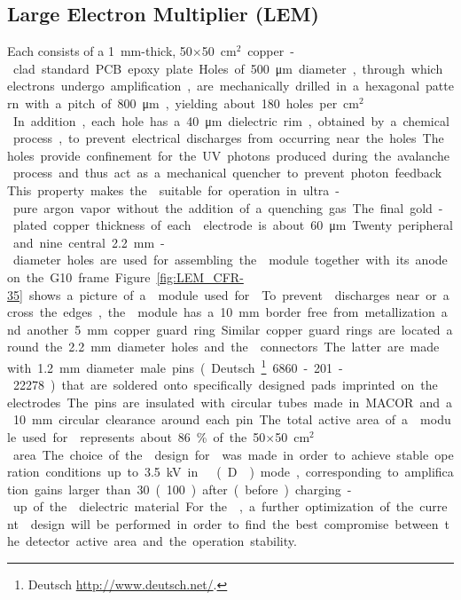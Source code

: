 \subsection{Large Electron Multiplier (LEM)}
\label{sec:fddp-crp-lem}

Each  consists of a \SI{1}{mm}-thick,  \num{50}$\times$\SI{50}{cm$^{2}$} copper-clad standard PCB epoxy plate. Holes of \SI{500}{\micro\meter} diameter, through which electrons undergo amplification, are mechanically drilled in a hexagonal pattern with a pitch of \SI{800}{\micro\meter}, yielding about \num{180} holes per \si{cm$^2$}. In addition, each hole has a  \SI{40}{\micro\meter} dielectric rim, obtained by a chemical process, to prevent electrical discharges from occurring near the holes. The holes provide confinement for the UV photons produced during the avalanche process and thus act as a mechanical quencher to prevent photon feedback. This property makes the  suitable for operation in ultra-pure argon vapor without the addition of a quenching gas. The final gold-plated copper thickness of each  electrode is about  \SI{60}{\micro\meter}. Twenty peripheral and nine central \SI{2.2}{mm}-diameter holes are used for assembling the  module together with its anode on the G10 frame. Figure~\ref{fig:LEM_CFR-35} shows a picture of a  module used for  . To prevent  discharges near or across the edges, the  module has a  \SI{10}{mm} border free from metallization and another \SI{5}{mm} copper guard ring. Similar copper guard rings are located around the \SI{2.2}{mm} diameter holes and the  connectors. The latter are made with \SI{1.2}{mm} diameter male pins (Deutsch\footnote{Deutsch\texttrademark{} \url{http://www.deutsch.net/}.} 6860-201-22278.) that are soldered onto specifically designed pads imprinted on the  electrodes. The pins are insulated with circular tubes made in MACOR and a  \SI{10}{mm} circular clearance around each pin. 

The total active area of a  module used for   represents about \SI{86}{\%} of the \num{50}$\times$\SI{50}{cm$^{2}$} area. The choice of the  design for   was made in order to achieve stable operation conditions up to \SI{3.5}{kV} in \dual \lar (D\lar{}) mode, corresponding to amplification gains larger than \num{30} (\num{100}) after (before) charging-up of the  dielectric material. For the , a further optimization of the current  design will  be performed in order  to find the best compromise between the detector active area and the operation stability.

